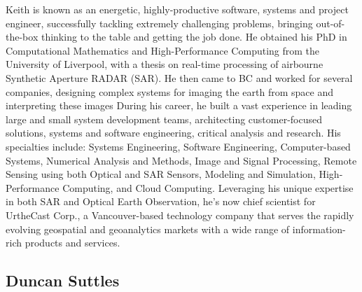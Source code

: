 Keith is known as an energetic, highly-productive software, systems
and project engineer, successfully tackling extremely challenging
problems, bringing out-of-the-box thinking to the table and getting
the job done. He obtained his PhD in Computational Mathematics and
High-Performance Computing from the University of Liverpool, with a
thesis on real-time processing of airbourne Synthetic Aperture
RADAR (SAR). He then came to BC and worked for several companies, designing complex
systems for imaging the earth from space and interpreting these images
During his career, he built a vast experience in leading large and small system
development teams, architecting customer-focused solutions, systems
and software engineering, critical analysis and research. His
specialties include: Systems Engineering, Software Engineering,
Computer-based Systems, Numerical Analysis and Methods, Image and
Signal Processing, Remote Sensing using both Optical and SAR Sensors,
Modeling and Simulation, High-Performance Computing, and Cloud
Computing. Leveraging his unique expertise in both SAR and Optical Earth
Observation, he's now chief scientist for UrtheCast Corp., a Vancouver-based
technology company that serves the rapidly evolving geospatial and
geoanalytics markets with a wide range of information-rich products
and services.

\subsection*{Duncan Suttles}
